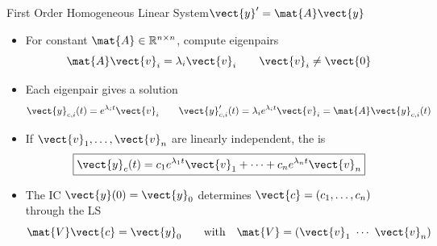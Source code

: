 \begin{frame}{First Order Homogeneous Linear System\quad $\vect{y}'=\mat{A}\vect{y}$}
\begin{itemize}
  \item For constant $\mat{A}\in\mathbb{R}^{n\times n}$, compute eigenpairs
  \[
    \mat{A}\vect{v}_i=\lambda_i\vect{v}_i
    \qquad \vect{v}_i\ne\vect{0}
  \]
  \item Each eigenpair gives a solution
  \[
    \vect{y}_{c,i}(t)=e^{\lambda_i t}\vect{v}_i
    \qquad
    \vect{y}_{c,i}'(t)=\lambda_i e^{\lambda_i t}\vect{v}_i
    =\mat{A}\vect{y}_{c,i}(t)
  \]
  \item If $\vect{v}_1,\ldots,\vect{v}_n$ are linearly independent, the  is
  \[
    \boxed{\vect{y}_c(t)=c_1e^{\lambda_1t}\vect{v}_1+\cdots+c_ne^{\lambda_nt}\vect{v}_n}
  \]
  \item The IC $\vect{y}(0)=\vect{y}_0$ determines $\vect{c}=(c_1,\ldots,c_n)$ through the LS
  \[
    \mat{V}\vect{c}=\vect{y}_0
    \qquad \mbox{with} \quad  \mat{V}=(\vect{v}_1\ \cdots\ \vect{v}_n)
  \]
\end{itemize}
\end{frame}
